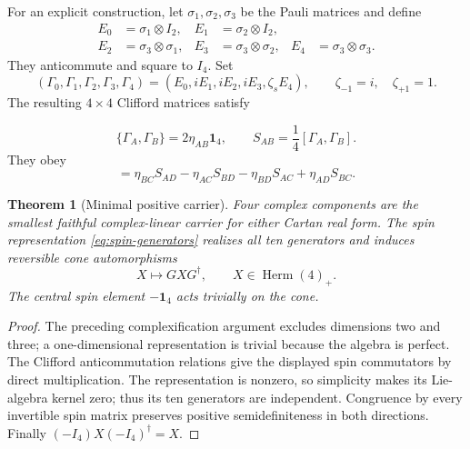 \documentclass[11pt]{article}
\newtheorem{theorem}{Theorem}[section]
\theoremstyle{remark}\newtheorem{remark}[theorem]{Remark}
\newcommand{\Herm}{\operatorname{Herm}}
\newcommand{\id}{\mathbf 1}
\begin{document}
For an explicit construction, let $\sigma_1,\sigma_2,\sigma_3$ be the Pauli
matrices and define
\begin{align}
 E_0&=\sigma_1\otimes I_2,&E_1&=\sigma_2\otimes I_2,\nonumber\\
 E_2&=\sigma_3\otimes\sigma_1,&E_3&=\sigma_3\otimes\sigma_2,
 &E_4&=\sigma_3\otimes\sigma_3 .
 \label{eq:euclidean-gamma}
\end{align}
They anticommute and square to $I_4$.
Set
\begin{equation}
 (\Gamma_0,\Gamma_1,\Gamma_2,\Gamma_3,\Gamma_4)
 =(E_0,iE_1,iE_2,iE_3,\zeta_s E_4),\qquad
 \zeta_{-1}=i,\quad\zeta_{+1}=1.
 \label{eq:explicit-gamma}
\end{equation}
The resulting $4\times4$ Clifford matrices satisfy

\begin{equation}
 \{\Gamma_A,\Gamma_B\}=2\eta_{AB}\id_4,\qquad
 S_{AB}=\frac14[\Gamma_A,\Gamma_B].
 \label{eq:spin-generators}
\end{equation}
They obey
\begin{equation}
 [S_{AB},S_{CD}]=\eta_{BC}S_{AD}-\eta_{AC}S_{BD}
 -\eta_{BD}S_{AC}+\eta_{AD}S_{BC}.
 \label{eq:spin-bracket}
\end{equation}

\begin{theorem}[Minimal positive carrier]
\label{thm:minimal-carrier}
Four complex components are the smallest faithful complex-linear carrier for either
Cartan real form.  The spin representation \eqref{eq:spin-generators} realizes all ten
generators and induces reversible cone automorphisms
\begin{equation}
 X\longmapsto GXG^\dagger,\qquad X\in\Herm(4)_+.
 \label{eq:four-cone-action}
\end{equation}
The central spin element $-\id_4$ acts trivially on the cone.
\end{theorem}
\begin{proof}
The preceding complexification argument excludes dimensions two and three;
a one-dimensional representation is trivial because the algebra is perfect.
The Clifford anticommutation relations give the displayed spin commutators
by direct multiplication.
The representation is nonzero, so simplicity makes its Lie-algebra kernel
zero; thus its ten generators are independent.
Congruence by every invertible spin matrix preserves positive
semidefiniteness in both directions.
Finally $(-I_4)X(-I_4)^\dagger=X$.
\end{proof}
\end{document}
